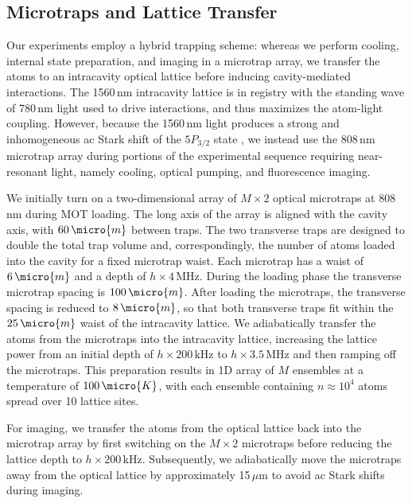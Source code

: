 \documentclass[aps,pra,twocolumn,superscriptaddress]{revtex4-1} %
\begin{document}
\begin{bibunit}
\subsection{Microtraps and Lattice Transfer}
Our experiments employ a hybrid trapping scheme: whereas we perform cooling, internal state preparation, and imaging in a microtrap array, we transfer the atoms to an intracavity optical lattice before inducing cavity-mediated interactions.  The 1560\,nm intracavity lattice is in registry with the standing wave of 780\,nm light used to drive interactions, and thus maximizes the atom-light coupling.  However, because the 1560\,nm light produces a strong and inhomogeneous ac Stark shift of the $5P_{3/2}$ state \cite{lee2014many}, we instead use the 808\,nm microtrap array during portions of the experimental sequence requiring near-resonant light, namely cooling, optical pumping, and fluorescence imaging.

We initially turn on a two-dimensional array of $M\times 2$ optical microtraps at 808\,nm during MOT loading.  The long axis of the array is aligned with the cavity axis, with $60\,\micro{m}$ between traps.  The two transverse traps are designed to double the total trap volume and, correspondingly, the number of atoms loaded into the cavity for a fixed microtrap waist.  Each microtrap has a waist of $6\,\micro{m}$ and a depth of $h\times 4\,\text{MHz}$.   During the loading phase the transverse microtrap spacing is $100\,\micro{m}$.  After loading the microtraps, the transverse spacing is reduced to $8\,\micro{m}$, so that both transverse traps fit within the $25\,\micro{m}$ waist of the intracavity lattice. We adiabatically transfer the atoms from the microtraps into the intracavity lattice, increasing the lattice power from an initial depth of $h\times 200\,\text{kHz}$ to $h\times 3.5\,\text{MHz}$ and then ramping off the microtraps. This preparation results in 1D array of $M$ ensembles at a temperature of $100\,\micro{K}$, with each ensemble containing $n \approx 10^4$ atoms spread over 10 lattice sites. 

For imaging, we transfer the atoms from the optical lattice back into the microtrap array by first switching on the $M\times 2$ microtraps before reducing the lattice depth to $h\times 200\,$kHz. Subsequently, we adiabatically move the microtraps away from the optical lattice by approximately 15\,$\mu$m to avoid ac Stark shifts during imaging.


\end{bibunit}
\end{document}
